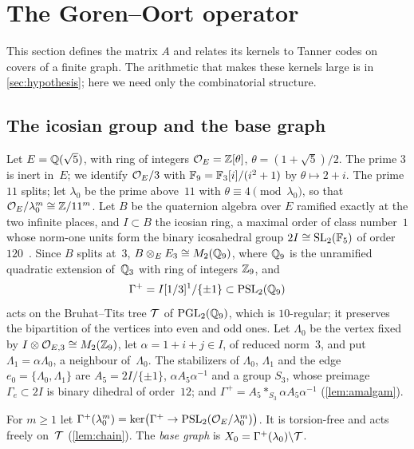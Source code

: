 \section{The Goren--Oort operator}\label{sec:operator}

This section defines the matrix $A$ and relates its kernels to Tanner codes on covers of a finite graph. The arithmetic
that makes these kernels large is in \cref{sec:hypothesis}; here we need only the combinatorial structure.

\subsection{The icosian group and the base graph}\label{sec:icosian}

Let $E=\mathbb{Q}(\sqrt5)$, with ring of integers $\mathcal{O}_E=\mathbb{Z}[\theta]$, $\theta=(1+\sqrt5)/2$. The prime $3$ is inert in~$E$; we
identify $\mathcal{O}_E/3$ with $\mathbb{F}_9=\mathbb{F}_3[i]/(i^2+1)$ by $\theta\mapsto2+i$. The prime $11$ splits; let $\lambda_0$ be the prime
above~$11$ with $\theta\equiv4\pmod{\lambda_0}$, so that $\mathcal{O}_E/\lambda_0^m\cong\mathbb{Z}/11^m$. Let $B$ be the quaternion algebra
over $E$ ramified exactly at the two infinite places, and $I\subset B$ the icosian ring, a maximal order of class
number~$1$ whose norm-one units form the binary icosahedral group $2I\cong\operatorname{SL}_2(\mathbb{F}_5)$ of order
$120$~\cite[Proposition~V.3.4 and p.~155]{Vigneras1980}. Since $B$ splits at~$3$, $B\otimes_EE_3\cong M_2(\mathbb{Q}_9)$, where $\mathbb{Q}_9$ is the unramified
quadratic extension of~$\mathbb{Q}_3$ with ring of integers $\mathbb{Z}_9$, and
\[
  \Gamma^+=I[1/3]^1/\{\pm1\}\subset\operatorname{PSL}_2(\mathbb{Q}_9)
\]
acts on the Bruhat--Tits tree $\mathcal{T}$ of $\operatorname{PGL}_2(\mathbb{Q}_9)$, which is $10$-regular; it preserves the bipartition of the
vertices into even and odd ones. Let $\Lambda_0$ be the vertex fixed by $I\otimes\mathcal{O}_{E,3}\cong M_2(\mathbb{Z}_9)$, let
$\alpha=1+i+j\in I$, of reduced norm~$3$, and put $\Lambda_1=\alpha\Lambda_0$, a neighbour of~$\Lambda_0$. The stabilizers
of $\Lambda_0$, $\Lambda_1$ and the edge $e_0=\{\Lambda_0,\Lambda_1\}$ are $A_5=2I/\{\pm1\}$, $\alpha A_5\alpha^{-1}$ and a
group $S_3$, whose preimage $\Gamma_e\subset2I$ is binary dihedral of order~$12$; and
$\Gamma^+=A_5*_{S_3}\alpha A_5\alpha^{-1}$ (\cref{lem:amalgam}).

For $m\ge1$ let $\Gamma^+(\lambda_0^m)=\ker\bigl(\Gamma^+\to\operatorname{PSL}_2(\mathcal{O}_E/\lambda_0^m)\bigr)$. It is torsion-free and acts
freely on~$\mathcal{T}$ (\cref{lem:chain}). The \emph{base graph} is $X_0=\Gamma^+(\lambda_0)\backslash\mathcal{T}$.

